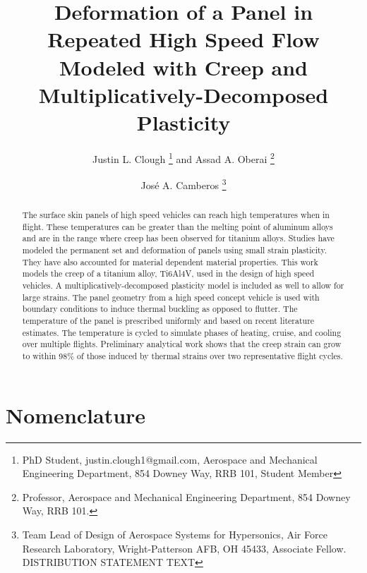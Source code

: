 \documentclass[conf]{new-aiaa}
\title{ Deformation of a Panel in Repeated High Speed Flow 
        Modeled with Creep and Multiplicatively-Decomposed Plasticity}
\author{Justin L. Clough%
        \footnote{
          PhD Student, 
          justin.clough1@gmail.com,
          Aerospace and Mechanical Engineering Department, 
          854 Downey Way, RRB 101,
          Student Member}
        and Assad A. Oberai%
        \footnote{  
          Professor, 
          Aerospace and Mechanical Engineering Department, 
          854 Downey Way, RRB 101.}}
\affil{University of Southern California,
       Los Angeles, CA, 90089}
\author{Jos\'e A. Camberos%
        \footnote{
          Team Lead of Design of Aerospace Systems for Hypersonics, 
          Air Force Research Laboratory,
          Wright-Patterson AFB, OH 45433,
          Associate Fellow.
          \newline
          \newline
          DISTRIBUTION STATEMENT TEXT}}
\affil{Air Force Research Laboratory, Wright-Patterson AFB,
       Dayton, OH, 45433}
\begin{document}
\maketitle


\begin{abstract}
The surface skin panels of high speed vehicles can reach high 
temperatures when in flight. 
These temperatures can be greater than the melting point
of aluminum alloys and are in the range where
creep has been observed for titanium alloys.
Studies have modeled the permanent set and deformation 
of panels using small strain plasticity.
They have also accounted for material 
dependent material properties.
This work models the creep of a titanium alloy, Ti6Al4V,
used in the design of high speed vehicles.
A multiplicatively-decomposed plasticity model
is included as well to allow for large strains.
The panel geometry from a high speed concept vehicle is
used with boundary conditions to induce thermal buckling
as opposed to flutter.
The temperature of the panel is prescribed uniformly 
and based on recent literature estimates.
The temperature is cycled to simulate phases of
heating, cruise, and cooling over multiple flights.
Preliminary analytical work shows that the creep strain can 
grow to within 98\% of those induced by thermal strains 
over two representative flight cycles.
\end{abstract}

\section{Nomenclature}
\end{document}
